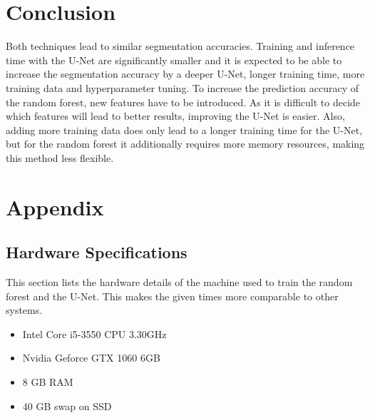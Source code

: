 \documentclass[final]{article}
\begin{document}
\section{Conclusion}
Both techniques lead to similar segmentation accuracies. Training and inference
time with the U-Net are significantly smaller and it is expected to be able to
increase the segmentation accuracy by a deeper U-Net, longer training time,
more training data and hyperparameter tuning. To increase the prediction
accuracy of the random forest, new features have to be introduced. As it is
difficult to decide which features will lead to better results, improving the
U-Net is easier. Also, adding more training data does only lead to a longer
training time for the U-Net, but for the random forest it additionally requires
more memory resources, making this method less flexible.

\section{Appendix}

\subsection{Hardware Specifications}
This section lists the hardware details of the machine used to train the random
forest and the U-Net. This makes the given times more comparable to other
systems.
\begin{itemize}
\item Intel Core i5-3550 CPU \@ 3.30GHz
\item Nvidia Geforce GTX 1060 6GB
\item 8 GB RAM
\item 40 GB swap on SSD
\end{itemize}

\clearpage
\end{document}
